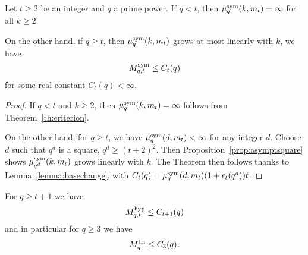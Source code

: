\documentclass[11pt]{article}
\begin{document}
\begin{thm}
Let $t\geq2$ be an integer and $q$ a prime power.
If $q<t$, then $\mu^{\textrm{sym}}_q(k,m_t)=\infty$ for all $k\geq2$.

On the other hand, if $q\geq t$,
then $\mu^{\textrm{sym}}_q(k,m_t)$ grows at most linearly with $k$, \ie we have
\[
M^{\textrm{sym}}_{q,t}\leq C_t(q)
\]
for some real constant $C_t(q)<\infty$.
\end{thm}
\begin{proof}
If $q<t$ and $k\geq2$, then $\mu^{\textrm{sym}}_q(k,m_t)=\infty$ follows from Theorem~\ref{th:criterion}.

On the other hand, for $q\geq t$, we have $\mu^{\textrm{sym}}_q(d,m_t)<\infty$ for any integer $d$.
Choose $d$ such that $q^d$ is a square, $q^d\geq(t+2)^2$.
Then Proposition~\ref{prop:asymptsquare} shows $\mu^{\textrm{sym}}_{q^d}(k,m_t)$ grows linearly with $k$.
The Theorem then follows thanks to Lemma~\ref{lemma:basechange}, with $C_t(q)=\mu^{\textrm{sym}}_q(d,m_t)(1+\epsilon_t(q^d))t$.
\end{proof}
\begin{cor}
For $q\geq t+1$ we have
\[
M^{\textrm{hyp}}_{q,t}\leq C_{t+1}(q)
\]
and in particular for $q\geq 3$ we have
\[
M^{\textrm{tri}}_q\leq C_{3}(q).
\]
\end{cor}
\end{document}
